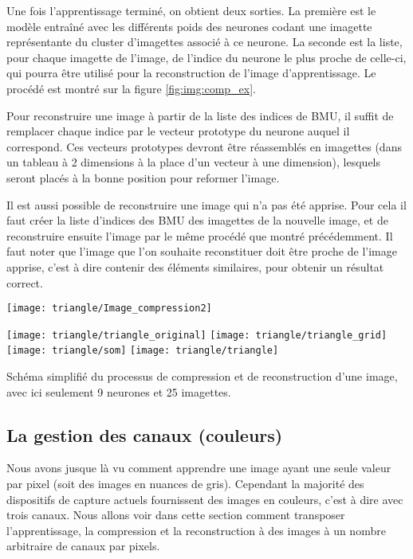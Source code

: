 	Une fois l'apprentissage terminé, on obtient deux sorties. La première est le modèle entraîné avec les différents poids des neurones codant une imagette représentante du cluster d'imagettes associé à ce neurone. La seconde est la liste, pour chaque imagette de l'image, de l'indice du neurone le plus proche de celle-ci, qui pourra être utilisé pour la reconstruction de l'image d'apprentissage. Le procédé est montré sur la figure \ref{fig:img:comp_ex}.

	Pour reconstruire une image à partir de la liste des indices de BMU, il suffit de remplacer chaque indice par le vecteur prototype du neurone auquel il correspond. Ces vecteurs prototypes devront être réassemblés en imagettes (dans un tableau à 2 dimensions à la place d'un vecteur à une dimension), lesquels seront placés à la bonne position pour reformer l'image.

	Il est aussi possible de reconstruire une image qui n'a pas été apprise. Pour cela il faut créer la liste d'indices des BMU des imagettes de la nouvelle image, et de reconstruire ensuite l'image par le même procédé que montré précédemment. Il faut noter que l'image que l'on souhaite reconstituer doit être proche de l'image apprise, c'est à dire contenir des éléments similaires, pour obtenir un résultat correct.

	\begin{figureth}
		\begin{subfigureth}{\textwidth}
			\texttt{[image: triangle/Image\_compression2]}
		\end{subfigureth}
		\begin{subfigureth}{\textwidth}
			\texttt{[image: triangle/triangle\_original]}\hfill
			\texttt{[image: triangle/triangle\_grid]}\hfill
			\texttt{[image: triangle/som]}\hfill
			\texttt{[image: triangle/triangle]}
		\end{subfigureth}
		\caption[Compression et décompression d'image]{Schéma simplifié du processus de compression et de reconstruction d'une image, avec ici seulement 9 neurones et 25 imagettes.}\label{fig:img:comp_ex}
	\end{figureth}

	\subsection{La gestion des canaux (couleurs)}\label{sec:img:colors}

	Nous avons jusque là vu comment apprendre une image ayant une seule valeur par pixel (soit des images en nuances de gris). Cependant la majorité des dispositifs de capture actuels fournissent des images en couleurs, c'est à dire avec trois canaux. Nous allons voir dans cette section comment transposer l'apprentissage, la compression et la reconstruction à des images à un nombre arbitraire de canaux par pixels.


